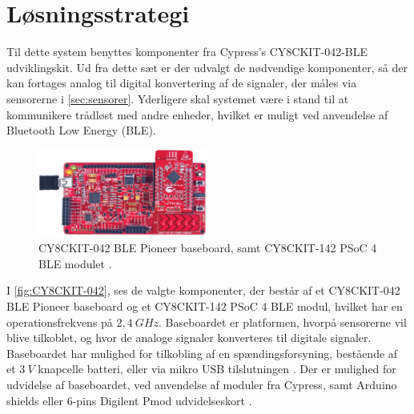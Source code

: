 \section{Løsningsstrategi}
Til dette system benyttes komponenter fra Cypress's CY8CKIT-042-BLE udviklingskit. 
Ud fra dette sæt er der udvalgt de nødvendige komponenter, så der kan fortages analog til digital konvertering af de signaler, der måles via sensorerne i \autoref{sec:sensorer}. Yderligere skal systemet være i stand til at kommunikere trådløst med andre enheder, hvilket er muligt ved anvendelse af Bluetooth Low Energy (BLE).


\begin{figure}[H]
\centering
\includegraphics[width=0.5\textwidth]{figures/CY8CKIT-042.png}
\caption{CY8CKIT-042 BLE Pioneer baseboard, samt CY8CKIT-142 PSoC 4 BLE modulet \citep{cypresspsoc2015}.}
\label{fig:CY8CKIT-042}
\end{figure}

I \autoref{fig:CY8CKIT-042}, ses de valgte komponenter, der består af et CY8CKIT-042 BLE Pioneer baseboard og et CY8CKIT-142 PSoC 4 BLE modul, hvilket har en operationsfrekvens på  $2,4~GHz$. Baseboardet er platformen, hvorpå sensorerne vil blive tilkoblet, og hvor de analoge signaler konverteres til digitale signaler. Baseboardet har mulighed for tilkobling af en spændingsforsyning, bestående af et $3~V$ knapcelle batteri, eller via mikro USB tilslutningen \citep{cypressguide2014}.
Der er mulighed for udvidelse af baseboardet, ved anvendelse af moduler fra Cypress, samt Arduino shields eller 6-pins Digilent Pmod udvidelseskort \citep{cypressguide2014}. 
\\


